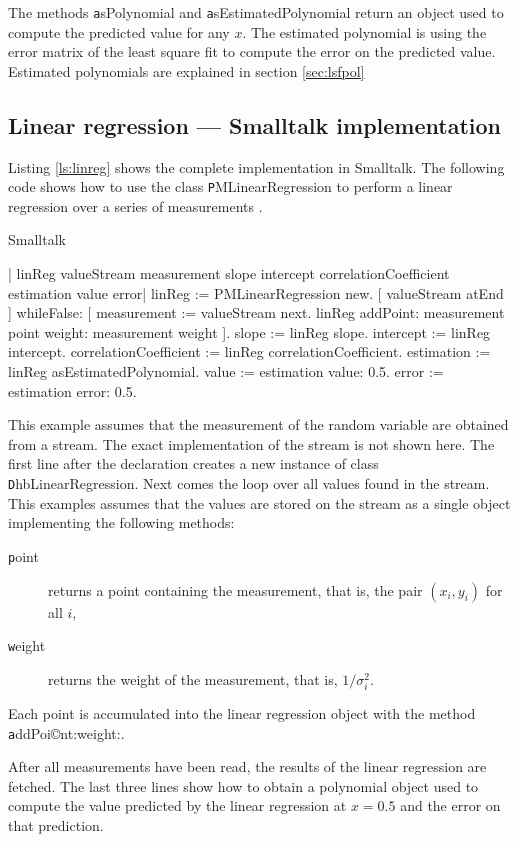 The methods {\texttt asPolynomial} and {\texttt asEstimatedPolynomial}
return an object used to compute the predicted value for any $x$.
The estimated polynomial is using the error matrix of the least
square fit to compute the error on the predicted value. Estimated
polynomials are explained in section \ref{sec:lsfpol}

\subsection{Linear regression --- Smalltalk  implementation}
Listing \ref{ls:linreg} shows the complete implementation in
Smalltalk. The following code shows how to use the class {\texttt
PMLinearRegression} to perform a linear regression over a series
of measurements .
\begin{displaycode}{Smalltalk}

 | linReg valueStream measurement slope intercept
   correlationCoefficient estimation value error|
 linReg := PMLinearRegression new.
 [ valueStream atEnd ]
        whileFalse: [ measurement := valueStream next.
                     linReg addPoint: measurement point
                              weight: measurement weight ].
 slope := linReg slope.
 intercept := linReg intercept.
 correlationCoefficient := linReg correlationCoefficient.
 estimation := linReg asEstimatedPolynomial.
 value := estimation value: 0.5.
 error := estimation error: 0.5.
\end{displaycode}
This example assumes that the measurement of the random variable
are obtained from a stream. The exact implementation of the stream
is not shown here. The first line after the declaration creates a
new instance of class {\texttt DhbLinearRegression}. Next comes the
loop over all values found in the stream. This examples assumes
that the values are stored on the stream as a single object
implementing the following methods:
\begin{description}
  \item[\texttt point] returns a point containing the measurement,
  that is, the pair $\left(x_i,y_i\right)$ for all $i$,
  \item[\texttt weight] returns the weight of the measurement, that
  is, $1/\sigma^2_i$.
\end{description}
\noindent Each point is accumulated into the linear regression
object with the method {\texttt addPoi©nt:weight:}.

After all measurements have been read, the results of the linear
regression are fetched.
The last three lines show how to obtain a
polynomial object used to compute the value predicted by the
linear regression at $x=0.5$ and the error on that prediction.

